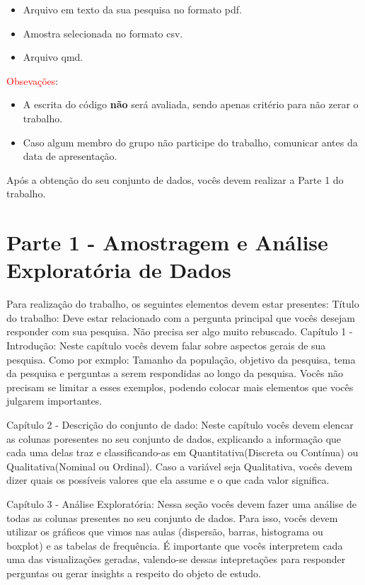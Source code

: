 \documentclass{article}
\begin{document}
\begin{itemize}
    \item Arquivo em texto da sua pesquisa no formato pdf. 
    \item Amostra selecionada no formato csv. 
    \item Arquivo qmd.  
\end{itemize}

\textcolor{red}{Obsevações}:
\begin{itemize}
    \item A escrita do código \textbf{não} será avaliada, sendo apenas critério para não zerar o trabalho. 
    \item Caso algum membro do grupo não participe do trabalho, comunicar antes da data de apresentação. 
\end{itemize}

Após a obtenção do seu conjunto de dados, vocês devem realizar a Parte 1 do trabalho. 

\section{Parte 1 - Amostragem e Análise Exploratória de Dados}

Para realização do trabalho, os seguintes elementos devem estar presentes:
Título do trabalho: Deve estar relacionado com a pergunta principal que vocês desejam responder com sua pesquisa. Não precisa ser algo muito rebuscado.  
Capítulo 1 - Introdução: Neste capítulo vocês devem falar sobre aspectos gerais de sua pesquisa. Como por exmplo: Tamanho da população, objetivo da pesquisa, tema da pesquisa e
perguntas a serem respondidas ao longo da pesquisa. Vocês não precisam se limitar a esses exemplos, podendo colocar mais elementos que vocês julgarem importantes. 

Capítulo 2 - Descrição do conjunto de dado: Neste capítulo vocês devem elencar as colunas poresentes no seu conjunto de dados, explicando a informação que cada uma delas traz 
e classificando-as em Quantitativa(Discreta ou Contínua) ou Qualitativa(Nominal ou Ordinal). Caso a variável seja Qualitativa, vocês devem dizer quais os possíveis valores que ela assume e 
o que cada valor significa. 

Capítulo 3 - Análise Exploratória: Nessa seção vocês devem fazer uma análise de todas as colunas presentes no seu conjunto de dados. Para isso, vocês devem utilizar
os gráficos que vimos nas aulas (dispersão, barras, histograma ou boxplot) e as tabelas de frequência. É importante que vocês interpretem cada uma das visualizações geradas, 
valendo-se dessas intepretações para responder perguntas ou gerar insights a respeito do objeto de estudo. 
\end{document}
